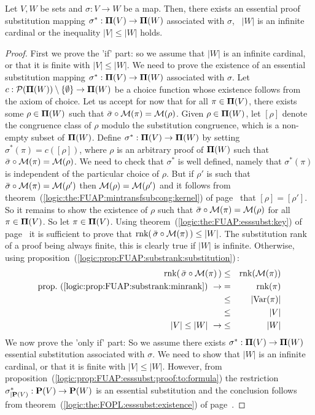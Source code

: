 \begin{theorem}\label{logic:the:FUAP:esssubst:existence}
Let $V,W$ be sets and $\sigma:V\to W$ be a map. Then, there exists
an essential proof substitution mapping $\sigma^{*}:\mbox{${\bf\Pi}(V)$}\to{\bf
\Pi}(W)$ associated with $\sigma$, \ifand\  $|W|$ is an infinite
cardinal or the inequality  $|V|\leq|W|$ holds.
\end{theorem}
\begin{proof}
First we prove the 'if' part: so we assume that $|W|$ is an infinite
cardinal, or that it is finite with $|V|\leq |W|$. We need to prove
the existence of an essential substitution mapping
$\sigma^{*}:\mbox{${\bf\Pi}(V)$}\to{\bf\Pi}(W)$ associated with $\sigma$. Let
$c:{\cal P}({\bf\Pi}(W))\setminus\{\emptyset\}\to{\bf\Pi}(W)$ be a
choice function whose existence follows from the axiom of choice.
Let us accept for now that for all $\pi\in\mbox{${\bf\Pi}(V)$}$, there exists some
$\rho\in{\bf\Pi}(W)$ such that $\bar{\sigma}\circ{\cal M}(\pi)={\cal
M}(\rho)$. Given $\rho\in{\bf\Pi}(W)$, let $[\rho]$ denote the
congruence class of $\rho$ modulo the substitution congruence, which
is a non-empty subset of ${\bf\Pi}(W)$. Define
$\sigma^{*}:\mbox{${\bf\Pi}(V)$}\to{\bf\Pi}(W)$ by setting
$\sigma^{*}(\pi)=c([\rho])$, where $\rho$ is an arbitrary proof of
${\bf\Pi}(W)$ such that $\bar{\sigma}\circ{\cal M}(\pi)={\cal
M}(\rho)$. We need to check that $\sigma^{*}$ is well defined,
namely that $\sigma^{*}(\pi)$ is independent of the particular
choice of $\rho$. But if $\rho'$ is such that
$\bar{\sigma}\circ{\cal M}(\pi)={\cal M}(\rho')$ then ${\cal
M}(\rho)={\cal M}(\rho')$ and it follows from
theorem~(\ref{logic:the:FUAP:mintransfsubcong:kernel}) of
page~\pageref{logic:the:FUAP:mintransfsubcong:kernel} that
$[\rho]=[\rho']$. So it remains to show the existence of $\rho$ such
that $\bar{\sigma}\circ{\cal M}(\pi)={\cal M}(\rho)$ for all
$\pi\in\mbox{${\bf\Pi}(V)$}$. So let $\pi\in\mbox{${\bf\Pi}(V)$}$. Using
theorem~(\ref{logic:the:FUAP:esssubst:key}) of
page~\pageref{logic:the:FUAP:esssubst:key} it is sufficient to prove
that $\mbox{\rm rnk}(\,\bar{\sigma}\circ{\cal M}(\pi)\,)\leq|W|$. The
substitution rank of a proof being always finite, this is clearly
true if $|W|$ is infinite. Otherwise, using
proposition~(\ref{logic:prop:FUAP:substrank:substitution})\,:
    \begin{eqnarray*}
    \mbox{\rm rnk}(\,\bar{\sigma}\circ{\cal M}(\pi)\,)&\leq&\mbox{\rm rnk}({\cal
    M}(\pi))\\
    \mbox{prop.~(\ref{logic:prop:FUAP:substrank:minrank})}\ \rightarrow
    &=&\mbox{\rm rnk}(\pi)\\
    &\leq&|\mbox{\rm Var}(\pi)|\\
    &\leq&|V|\\
    |V|\leq|W|\ \rightarrow&\leq&|W|
    \end{eqnarray*}
We now prove the 'only if' part: So we assume there exists
$\sigma^{*}:\mbox{${\bf\Pi}(V)$}\to{\bf\Pi}(W)$ essential substitution associated
with $\sigma$. We need to show that $|W|$ is an infinite cardinal,
or that it is finite with $|V|\leq |W|$. However, from
proposition~(\ref{logic:prop:FUAP:esssubst:proof:to:formula}) the
restriction $\sigma^{*}_{|{\bf P}(V)}:\mbox{${\bf P}(V)$}\to{\bf P}(W)$ is an
essential substitution and the conclusion follows from
theorem~(\ref{logic:the:FOPL:esssubst:existence}) of
page~\pageref{logic:the:FOPL:esssubst:existence}.
\end{proof}
